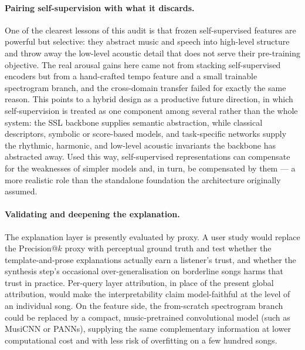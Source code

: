 \documentclass[12pt]{report}
\begin{document}
\paragraph{Pairing self-supervision with what it discards.}
One of the clearest lessons of this audit is that frozen self-supervised features are powerful but selective: they abstract music and speech into high-level structure and throw away the low-level acoustic detail that does not serve their pre-training objective. The real arousal gains here came not from stacking self-supervised encoders but from a hand-crafted tempo feature and a small trainable spectrogram branch, and the cross-domain transfer failed for exactly the same reason. This points to a hybrid design as a productive future direction, in which self-supervision is treated as one component among several rather than the whole system: the SSL backbone supplies semantic abstraction, while classical descriptors, symbolic or score-based models, and task-specific networks supply the rhythmic, harmonic, and low-level acoustic invariants the backbone has abstracted away. Used this way, self-supervised representations can compensate for the weaknesses of simpler models and, in turn, be compensated by them --- a more realistic role than the standalone foundation the architecture originally assumed.

\paragraph{Validating and deepening the explanation.}
The explanation layer is presently evaluated by proxy. A user study would replace the Precision@$k$ proxy with perceptual ground truth and test whether the template-and-prose explanations actually earn a listener's trust, and whether the synthesis step's occasional over-generalisation on borderline songs harms that trust in practice. Per-query layer attribution, in place of the present global attribution, would make the interpretability claim model-faithful at the level of an individual song. On the feature side, the from-scratch spectrogram branch could be replaced by a compact, music-pretrained convolutional model (such as MusiCNN or PANNs), supplying the same complementary information at lower computational cost and with less risk of overfitting on a few hundred songs.
\end{document}
